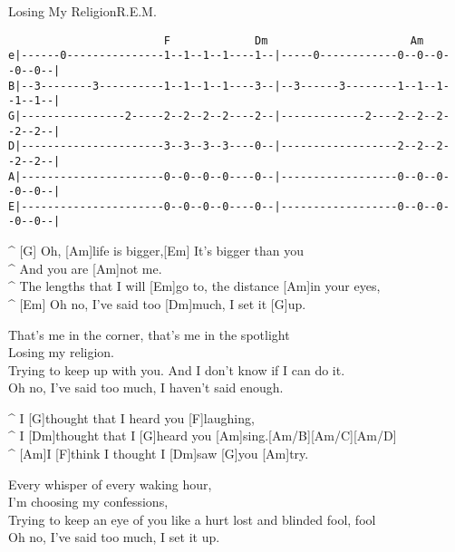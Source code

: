 \begin{song}{Losing My Religion}{R.E.M.}

{
\scriptsize
\begin{verbatim}
                        F             Dm                      Am
e|------0---------------1--1--1--1----1--|-----0------------0--0--0--0--0--|
B|--3--------3----------1--1--1--1----3--|--3------3--------1--1--1--1--1--|
G|----------------2-----2--2--2--2----2--|-------------2----2--2--2--2--2--|
D|----------------------3--3--3--3----0--|------------------2--2--2--2--2--|
A|----------------------0--0--0--0----0--|------------------0--0--0--0--0--|
E|----------------------0--0--0--0----0--|------------------0--0--0--0--0--|
\end{verbatim}
}

\begin{guitar}
^ [G]  Oh, [Am]life is bigger,[Em]  It's bigger than you\\
^ And you are [Am]not me.\\
^ The lengths that I will [Em]go to, the distance [Am]in your eyes,\\
^ [Em]  Oh no, I've said too [Dm]much, I set it [G]up.\\
\end{guitar}

\begin{guitar}
That's me in the corner, that's me in the spotlight\\
Losing my religion.\\
Trying to keep up with you. And I don't know if I can do it.\\
Oh no, I've said too much, I haven't said enough.\\
\end{guitar}

\begin{guitar}
^ I [G]thought that I heard you [F]laughing,\\
^ I [Dm]thought that I [G]heard you [Am]sing.[Am/B][Am/C][Am/D]\\
^ [Am]I  [F]think I thought I [Dm]saw [G]you [Am]try.\\
\end{guitar}

\begin{guitar}
Every whisper of every waking hour,\\
I'm choosing my confessions,\\
Trying to keep an eye of you like a hurt lost and blinded fool, fool\\
Oh no, I've said too much, I set it up.\\
\end{guitar}


\end{song}
